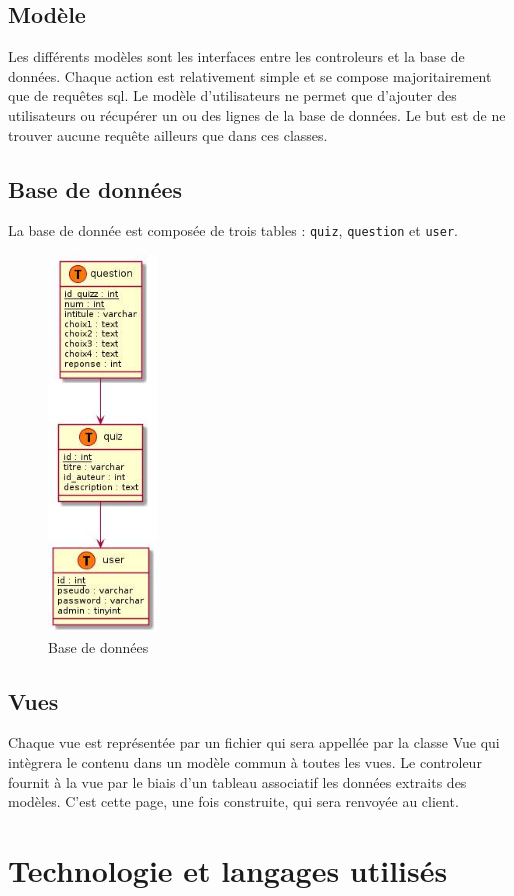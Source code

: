 \documentclass[11pt,titlepage]{article}
\begin{document}
\subsection{Modèle}
Les différents modèles sont les interfaces entre les controleurs et la base de données. 
Chaque action est relativement simple et se compose majoritairement que de requêtes sql.
Le modèle d'utilisateurs ne permet que d'ajouter des utilisateurs ou récupérer un ou des lignes de la base de données.
Le but est de ne trouver aucune requête ailleurs que dans ces classes.

\subsection{Base de données}
La base de donnée est composée de trois tables : \texttt{quiz}, \texttt{question} et \texttt{user}.
\begin{figure}[!h]
\centering
\includegraphics[height=10cm]{schemaBdd.jpg}
\caption{Base de données}
\end{figure}

\subsection{Vues}
Chaque vue est représentée par un fichier qui sera appellée par la classe Vue qui intègrera le contenu dans un modèle commun à toutes les vues.
Le controleur fournit à la vue par le biais d'un tableau associatif les données extraits des modèles.
C'est cette page, une fois construite, qui sera renvoyée au client.

\section{Technologie et langages utilisés}
\end{document}
